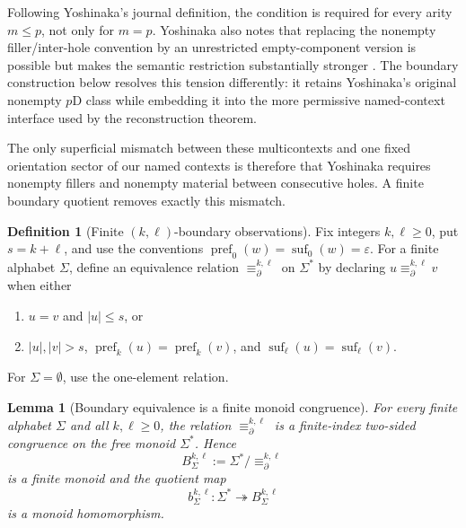 \documentclass[11pt,a4paper]{article}
\numberwithin{equation}{section}
\theoremstyle{plain}
\newtheorem{lemma}[theorem]{Lemma}
\theoremstyle{definition}
\newtheorem{definition}[theorem]{Definition}
\theoremstyle{remark}
\newcommand{\eps}{\varepsilon}
\begin{document}
Following Yoshinaka's journal definition, the condition is required for every
arity \(m\le p\), not only for \(m=p\).  Yoshinaka also notes that replacing the
nonempty filler/inter-hole convention by an unrestricted empty-component
version is possible but makes the semantic restriction substantially stronger
\cite[footnote~3, p.~1824]{Yoshinaka2011}.  The boundary construction below
resolves this tension differently: it retains Yoshinaka's original nonempty
\(p\)D class while embedding it into the more permissive named-context
interface used by the reconstruction theorem.

The only superficial mismatch between these multicontexts and one fixed
orientation sector of our named contexts is therefore that Yoshinaka requires
nonempty fillers and nonempty material between consecutive holes.  A finite
boundary quotient removes exactly this mismatch.


\begin{definition}[Finite \((k,\ell)\)-boundary observations]
\label{def:boundary-observation}
Fix integers \(k,\ell\ge0\), put \(s=k+\ell\), and use the conventions
\(\operatorname{pref}_0(w)=\operatorname{suf}_0(w)=\eps\).
For a finite alphabet \(\Sigma\), define an equivalence relation
\(\equiv_{\partial}^{k,\ell}\) on \(\Sigma^*\) by declaring
\(u\equiv_{\partial}^{k,\ell}v\) when either
\begin{enumerate}[label=(\roman*),leftmargin=*]
\item \(u=v\) and \(|u|\le s\), or
\item \(|u|,|v|>s\),
\(\operatorname{pref}_k(u)=\operatorname{pref}_k(v)\), and
\(\operatorname{suf}_\ell(u)=\operatorname{suf}_\ell(v)\).
\end{enumerate}
For \(\Sigma=\emptyset\), use the one-element relation.
\end{definition}

\begin{lemma}[Boundary equivalence is a finite monoid congruence]
\label{lem:boundary-congruence}
For every finite alphabet $\Sigma$ and all $k,\ell\ge0$, the relation
$\equiv_{\partial}^{k,\ell}$ is a finite-index two-sided congruence on the
free monoid $\Sigma^*$.  Hence
\[
  B_\Sigma^{k,\ell}:=\Sigma^*/{\equiv_{\partial}^{k,\ell}}
\]
is a finite monoid and the quotient map
\[
  b_\Sigma^{k,\ell}:\Sigma^*\twoheadrightarrow B_\Sigma^{k,\ell}
\]
is a monoid homomorphism.
\end{lemma}
\end{document}
